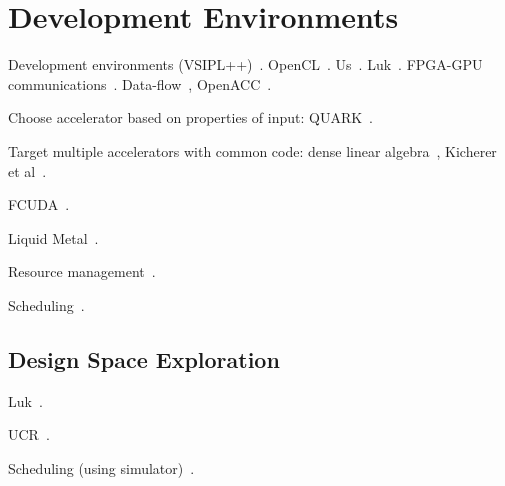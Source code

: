 \section{Development Environments}
\label{sec:dev}

Development environments (VSIPL++)~\cite{mlk12}.
OpenCL~\cite{Ahmed11}.
Us~\cite{blc17,cft+10,ctg+07,ftb+06,wcc12,wcc13}.
Luk~\cite{ttpl11}.
FPGA-GPU communications~\cite{brf14,tdm13,tdmp15}.
Data-flow~\cite{szb+12},
OpenACC~\cite{lkv16}.

Choose accelerator based on properties of input:
QUARK~\cite{hcy+14,hjl+15}.

Target multiple accelerators with common code:
dense linear algebra~\cite{daa+15},
Kicherer et al~\cite{knbk12}.

FCUDA~\cite{pgs+13}.

Liquid Metal~\cite{abb+12}.

Resource management~\cite{bdm+13}.

Scheduling~\cite{lk17,lp17}.

\subsection{Design Space Exploration}

Luk~\cite{ll12,ll11,slkk13}.

UCR~\cite{bbg13}.

Scheduling (using simulator)~\cite{blby11}.

